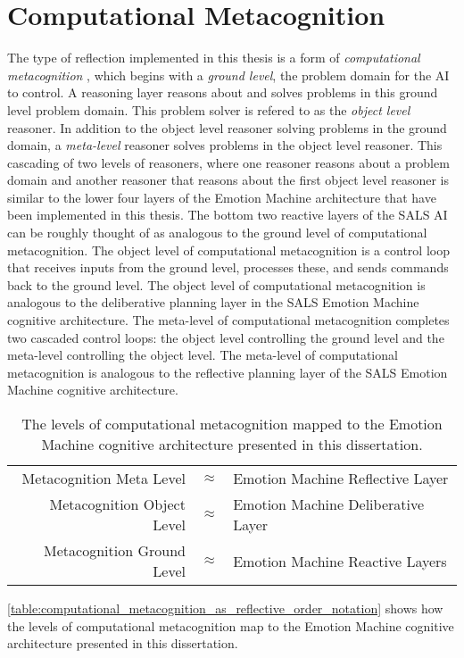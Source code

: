 \section{Computational Metacognition}

The type of reflection implemented in this thesis is a form of
{\emph{computational metacognition}}
\cite[]{cox_and_raja:2008,cox:2010}, which begins with a {\emph{ground
    level}}, the problem domain for the AI to control.  A reasoning
layer reasons about and solves problems in this ground level problem
domain.  This problem solver is refered to as the {\emph{object
    level}} reasoner.  In addition to the object level reasoner
solving problems in the ground domain, a {\emph{meta-level}} reasoner
solves problems in the object level reasoner.  This cascading of two
levels of reasoners, where one reasoner reasons about a problem domain
and another reasoner that reasons about the first object level
reasoner is similar to the lower four layers of the Emotion Machine
architecture that have been implemented in this thesis.  The bottom
two reactive layers of the SALS AI can be roughly thought of as
analogous to the ground level of computational metacognition.  The
object level of computational metacognition is a control loop that
receives inputs from the ground level, processes these, and sends
commands back to the ground level.  The object level of computational
metacognition is analogous to the deliberative planning layer in the
SALS Emotion Machine cognitive architecture.  The meta-level of
computational metacognition completes two cascaded control loops: the
object level controlling the ground level and the meta-level
controlling the object level.  The meta-level of computational
metacognition is analogous to the reflective planning layer of the
SALS Emotion Machine cognitive architecture.
\begin{table}
\begin{tabular}{|rll|}
\hline
Metacognition Meta Level   &${\approx}$ &Emotion Machine Reflective Layer \\
Metacognition Object Level &${\approx}$ &Emotion Machine Deliberative Layer \\
Metacognition Ground Level &${\approx}$ &Emotion Machine Reactive Layers \\
\hline
\end{tabular}
\caption{The levels of computational metacognition mapped to the
  Emotion Machine cognitive architecture presented in this
  dissertation.}
\label{table:computational_metacognition_as_reflective_order_notation}
\end{table}
\autoref{table:computational_metacognition_as_reflective_order_notation}
shows how the levels of computational metacognition map to the Emotion
Machine cognitive architecture presented in this dissertation.

